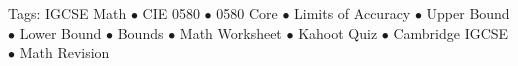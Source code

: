 \documentclass[11pt,a4paper]{article}
\begin{document}
\vspace{14pt}
\begin{center}
  \sffamily\scriptsize\textcolor{textmuted}{
    Tags: IGCSE Math $\bullet$ CIE 0580 $\bullet$ 0580 Core $\bullet$ Limits of Accuracy $\bullet$ Upper Bound $\bullet$ Lower Bound $\bullet$ Bounds $\bullet$ Math Worksheet $\bullet$ Kahoot Quiz $\bullet$ Cambridge IGCSE $\bullet$ Math Revision
  }
\end{center}
\end{document}
